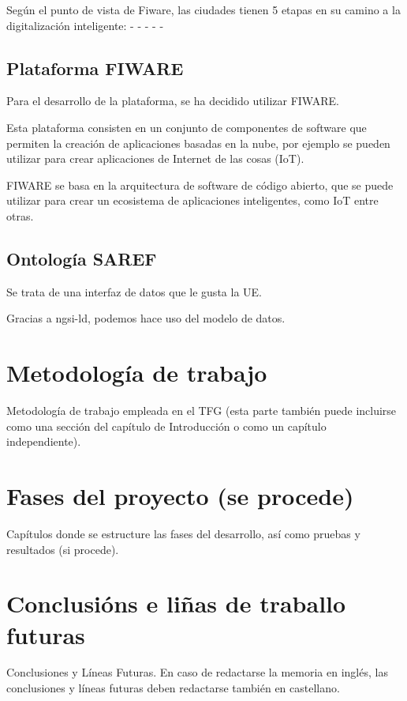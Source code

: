 \documentclass[12pt, a4paper, twoside]{article}
\begin{document}
 Según el punto de vista de Fiware, las ciudades tienen 5 etapas en su camino a la digitalización inteligente:
 - 
 -
 -
 -
 -



  \subsection{Plataforma FIWARE} 
 Para el desarrollo de la plataforma, se ha decidido utilizar FIWARE.
 
Esta plataforma consisten en un conjunto de componentes de software que permiten la creación 
de aplicaciones basadas en la nube, por ejemplo se pueden utilizar para crear aplicaciones de 
Internet de las cosas (IoT). 

FIWARE se basa en la arquitectura de software de código abierto, que se puede utilizar para crear 
un ecosistema de aplicaciones inteligentes, como IoT entre otras.


  \subsection{Ontología SAREF}
  Se trata de una interfaz de datos que le gusta la UE.

  Gracias a ngsi-ld, podemos hace uso del modelo de datos.

 \section{Metodología de trabajo}
 Metodología de trabajo empleada en el TFG (esta parte también puede incluirse como una sección del capítulo de Introducción o como un capítulo independiente).

 \section{Fases del proyecto (se procede)}
 Capítulos donde se estructure las fases del desarrollo, así como pruebas y resultados (si procede). 

\section{Conclusións e liñas de traballo futuras}
Conclusiones y Líneas Futuras. En caso de redactarse la memoria en inglés, las conclusiones y líneas futuras deben redactarse también en castellano.
\end{document}
